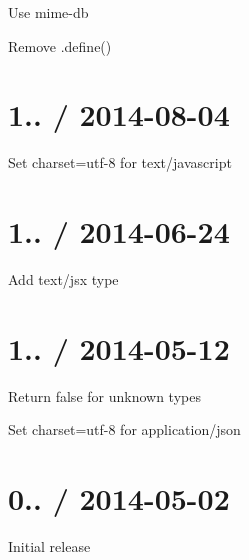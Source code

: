 \begin{DoxyItemize}
\item Use {\ttfamily mime-\/db}
\item Remove {\ttfamily .define()}
\end{DoxyItemize}

\section*{1.. / 2014-\/08-\/04 }


\begin{DoxyItemize}
\item Set charset=utf-\/8 for {\ttfamily text/javascript}
\end{DoxyItemize}

\section*{1.. / 2014-\/06-\/24 }


\begin{DoxyItemize}
\item Add {\ttfamily text/jsx} type
\end{DoxyItemize}

\section*{1.. / 2014-\/05-\/12 }


\begin{DoxyItemize}
\item Return {\ttfamily false} for unknown types
\item Set charset=utf-\/8 for {\ttfamily application/json}
\end{DoxyItemize}

\section*{0.. / 2014-\/05-\/02 }


\begin{DoxyItemize}
\item Initial release 
\end{DoxyItemize}